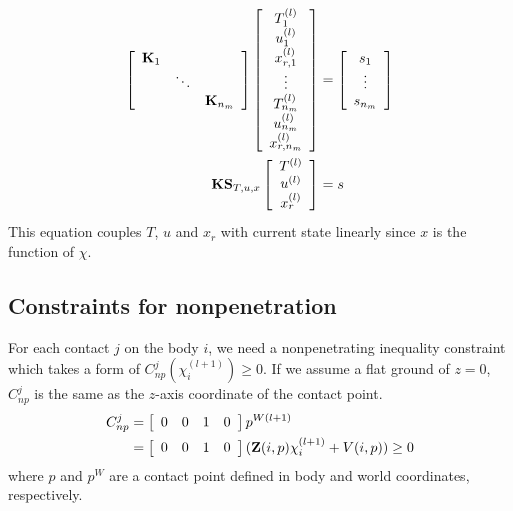 \documentclass[a4paper,10pt]{article}
\begin{document}
\begin{align}
\left [
\begin{array}{ccc}
\mathbf{K}_1 &        &                  \\
             & \ddots &                  \\
             &        & \mathbf{K}_{n_m}
\end{array}
\right ]
\left [
\begin{array}{c}
T_1^{(l)} \\ u_1^{(l)} \\ x_{r,1}^{(l)} \\
\vdots\\
T_{n_m}^{(l)} \\ u_{n_m}^{(l)} \\ x_{r,n_m}^{(l)}
\end{array}
\right ]  & = 
\left [
\begin{array}{c}
s_1 \\
\vdots \\
s_{n_m}
\end{array}
\right ]\notag\\
\mathbf{K}\mathbf{S}_{T,u,x} \left [
\begin{array}{c}
T^{(l)} \\ u^{(l)} \\ x_{r}^{(l)}
\end{array}
\right ] &= s\label{Muscle_fiber_constraint}
\end{align}
This equation couples $T$, $u$ and $x_r$ with current state linearly
since $x$ is the function of $\chi$.

\subsection{Constraints for nonpenetration}
For each contact $j$ on the body $i$, we need a nonpenetrating inequality constraint which
takes a form of $C_{np}^j (\chi^{(l+1)}_i) \geq 0$.
If we assume a flat ground of $z=0$, $C_{np}^j$ is the same as
the $z$-axis coordinate of the contact point.
\begin{align}
C_{np}^j & = \left [ \begin{array}{cccc} 0 & 0 & 1 & 0 \end{array} \right ] p^{W(l+1)} \notag\\
         & = \left [ \begin{array}{cccc} 0 & 0 & 1 & 0 \end{array} \right ] ( \mathbf{Z}(i,p) \chi^{(l+1)}_i + V(i,p) ) \geq 0
\end{align}
where $p$ and $p^W$ are a contact point defined in body and world coordinates, respectively.
\end{document}

